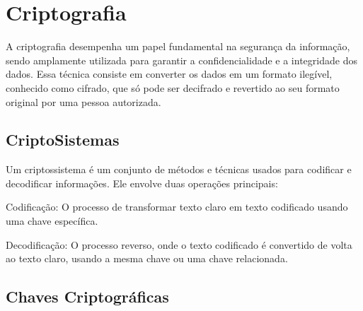 \newcommand{\texCommand}[1]{\texttt{\textbackslash{#1}}}%

\newcommand{\exemplo}[1]{%
\vspace{\baselineskip}%
\noindent\fbox{\begin{minipage}{\textwidth}#1\end{minipage}}%
\\\vspace{\baselineskip}}%

\newcommand{\exemploVerbatim}[1]{%
\vspace{\baselineskip}%
\noindent\fbox{\begin{minipage}{\textwidth}%
#1\end{minipage}}%
\\\vspace{\baselineskip}}%

\section{Criptografia} %

A criptografia desempenha um papel fundamental na segurança da informação, sendo amplamente utilizada para garantir a confidencialidade e a integridade dos dados. Essa técnica consiste em converter os dados em um formato ilegível, conhecido como cifrado, que só pode ser decifrado e revertido ao seu formato original por uma pessoa autorizada.

\subsection{CriptoSistemas}

Um criptossistema é um conjunto de métodos e técnicas usados para codificar e decodificar informações. Ele envolve duas operações principais:

Codificação: O processo de transformar texto claro em texto codificado usando uma chave específica.

Decodificação: O processo reverso, onde o texto codificado é convertido de volta ao texto claro, usando a mesma chave ou uma chave relacionada.

\subsection{Chaves Criptográficas}


